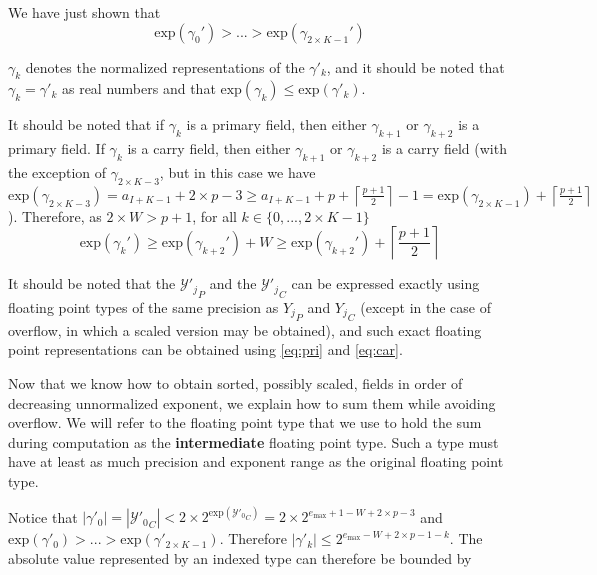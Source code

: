 \documentclass[12pt]{article}
\providecommand{\ceil}[1]{\left \lceil #1 \right \rceil }
\providecommand{\exp}{\ensuremath{\text{exp}}}
\providecommand{\max}{\ensuremath{\text{max}}}
\theoremstyle{definition}
\numberwithin{equation}{section}
\numberwithin{figure}{section}
\begin{document}
    We have just shown that
    \begin{equation}
      \exp(\gamma_0') > ... > \exp(\gamma_{2 \times K - 1}')
      \label{eq:gammadecreases}
    \end{equation}

    $\gamma_k$ denotes the normalized representations of the $\gamma'_k$, and it should be noted that $\gamma_k = \gamma'_k$ as real numbers and that $\exp(\gamma_k) \leq \exp(\gamma'_k)$.

    It should be noted that if $\gamma_k$ is a primary field, then either $\gamma_{k + 1}$ or $\gamma_{k + 2}$ is a primary field. If $\gamma_k$ is a carry field, then either $\gamma_{k + 1}$ or $\gamma_{k + 2}$ is a carry field (with the exception of $\gamma_{2 \times K - 3}$, but in this case we have $\exp(\gamma_{2 \times K - 3}) = a_{I + K - 1} + 2 \times p - 3 \geq a_{I + K - 1} + p + \ceil{\frac{p + 1}{2}} - 1 = \exp(\gamma_{2 \times K - 1}) + \ceil{\frac{p + 1}{2}}$). Therefore, as $2 \times W > p + 1$, for all $k \in \{0, ..., 2 \times K - 1\}$
    \begin{equation}
      \exp(\gamma_k') \geq \exp(\gamma_{k + 2}') + W \geq \exp(\gamma_{k + 2}') + \ceil{\frac{p + 1}{2}}
      \label{eq:gammadecreasesfast}
    \end{equation}

    It should be noted that the ${\mathcal{Y}'_j}_P$ and the ${\mathcal{Y}'_j}_C$ can be expressed exactly using floating point types of the same precision as ${Y_j}_P$ and ${Y_j}_C$ (except in the case of overflow, in which a scaled version may be obtained), and such exact floating point representations can be obtained using  \eqref{eq:pri} and  \eqref{eq:car}.

    Now that we know how to obtain sorted, possibly scaled, fields in order of decreasing unnormalized exponent, we explain how to sum them while avoiding overflow. We will refer to the floating point type that we use to hold the sum during computation as the \textbf{intermediate} floating point type. Such a type must have at least as much precision and exponent range as the original floating point type.

    Notice that $|\gamma'_0| = |{\mathcal{Y}'_0}_C| < 2 \times 2^{\exp({\mathcal{Y}'_0}_C)} = 2 \times 2^{e_{\max} + 1 - W + 2 \times p - 3}$ and $\exp(\gamma'_0) > ... > \exp(\gamma'_{2 \times K - 1})$.  Therefore $|\gamma'_k| \leq 2^{e_{\max} - W + 2 \times p - 1 - k}$. The absolute value represented by an indexed type can therefore be bounded by
\end{document}
